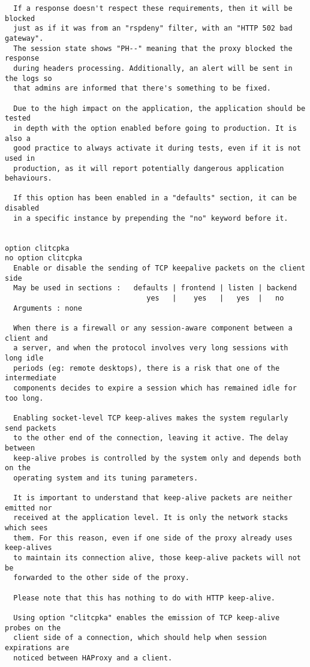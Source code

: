 \begin{verbatim}
  If a response doesn't respect these requirements, then it will be blocked
  just as if it was from an "rspdeny" filter, with an "HTTP 502 bad gateway".
  The session state shows "PH--" meaning that the proxy blocked the response
  during headers processing. Additionally, an alert will be sent in the logs so
  that admins are informed that there's something to be fixed.

  Due to the high impact on the application, the application should be tested
  in depth with the option enabled before going to production. It is also a
  good practice to always activate it during tests, even if it is not used in
  production, as it will report potentially dangerous application behaviours.

  If this option has been enabled in a "defaults" section, it can be disabled
  in a specific instance by prepending the "no" keyword before it.


option clitcpka
no option clitcpka
  Enable or disable the sending of TCP keepalive packets on the client side
  May be used in sections :   defaults | frontend | listen | backend
                                 yes   |    yes   |   yes  |   no
  Arguments : none

  When there is a firewall or any session-aware component between a client and
  a server, and when the protocol involves very long sessions with long idle
  periods (eg: remote desktops), there is a risk that one of the intermediate
  components decides to expire a session which has remained idle for too long.

  Enabling socket-level TCP keep-alives makes the system regularly send packets
  to the other end of the connection, leaving it active. The delay between
  keep-alive probes is controlled by the system only and depends both on the
  operating system and its tuning parameters.

  It is important to understand that keep-alive packets are neither emitted nor
  received at the application level. It is only the network stacks which sees
  them. For this reason, even if one side of the proxy already uses keep-alives
  to maintain its connection alive, those keep-alive packets will not be
  forwarded to the other side of the proxy.

  Please note that this has nothing to do with HTTP keep-alive.

  Using option "clitcpka" enables the emission of TCP keep-alive probes on the
  client side of a connection, which should help when session expirations are
  noticed between HAProxy and a client.


\end{verbatim}
